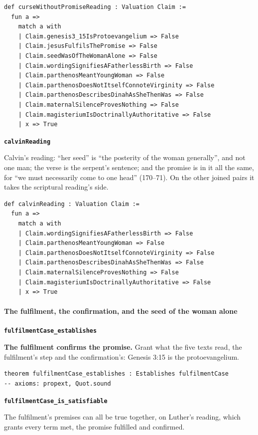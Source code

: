 \documentclass[11pt]{article}
\begin{document}
{\small\begin{verbatim}
def curseWithoutPromiseReading : Valuation Claim :=
  fun a =>
    match a with
    | Claim.genesis3_15IsProtoevangelium => False
    | Claim.jesusFulfilsThePromise => False
    | Claim.seedWasOfTheWomanAlone => False
    | Claim.wordingSignifiesAFatherlessBirth => False
    | Claim.parthenosMeantYoungWoman => False
    | Claim.parthenosDoesNotItselfConnoteVirginity => False
    | Claim.parthenosDescribesDinahAsSheThenWas => False
    | Claim.maternalSilenceProvesNothing => False
    | Claim.magisteriumIsDoctrinallyAuthoritative => False
    | x => True
\end{verbatim}}
\par\medskip\noindent\textbf{\texttt{calvin\allowbreak{}Reading}}\par\nobreak\noindent
Calvin’s reading: “her seed” is “the posterity of the woman generally”, and not one man; the verse is the serpent’s sentence; and the promise is in it all the same, for “we must necessarily come to one head” (170–71). On the other joined pairs it takes the scriptural reading’s side.

{\small\begin{verbatim}
def calvinReading : Valuation Claim :=
  fun a =>
    match a with
    | Claim.wordingSignifiesAFatherlessBirth => False
    | Claim.parthenosMeantYoungWoman => False
    | Claim.parthenosDoesNotItselfConnoteVirginity => False
    | Claim.parthenosDescribesDinahAsSheThenWas => False
    | Claim.maternalSilenceProvesNothing => False
    | Claim.magisteriumIsDoctrinallyAuthoritative => False
    | x => True
\end{verbatim}}
\paragraph*{The fulfilment, the confirmation, and the seed of the woman alone}
\leavevmode\par\nobreak
\par\medskip\noindent\textbf{\texttt{fulfilment\allowbreak{}Case\_\allowbreak{}establishes}}\par\nobreak\noindent
\textbf{The fulfilment confirms the promise.} Grant what the five texts read, the fulfilment’s step and the confirmation’s: Genesis 3:15 is the protoevangelium.

{\small\begin{verbatim}
theorem fulfilmentCase_establishes : Establishes fulfilmentCase
-- axioms: propext, Quot.sound
\end{verbatim}}
\par\medskip\noindent\textbf{\texttt{fulfilment\allowbreak{}Case\_\allowbreak{}is\_\allowbreak{}satisfiable}}\par\nobreak\noindent
The fulfilment’s premises can all be true together, on Luther’s reading, which grants every term met, the promise fulfilled and confirmed.
\end{document}
